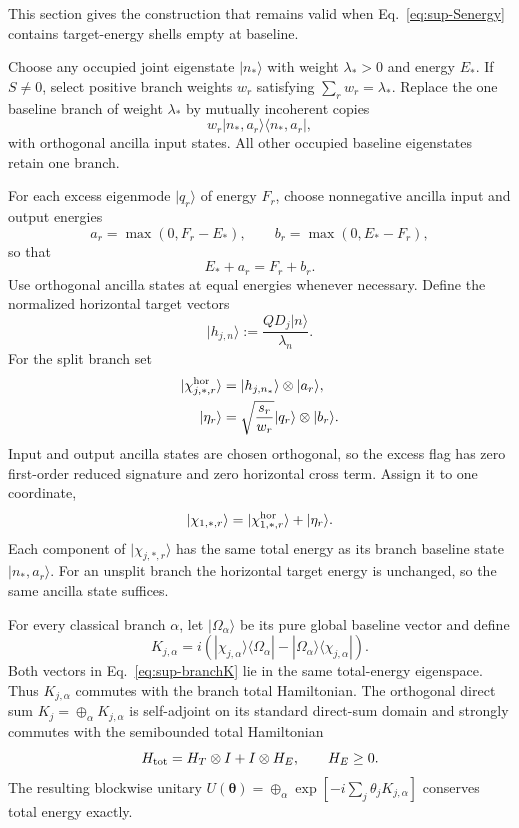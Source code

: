 \documentclass[aps,pra,preprint,nofootinbib]{revtex4-2}
\begin{document}
This section gives the construction that remains valid when Eq.~\eqref{eq:sup-Senergy} contains target-energy shells empty at baseline.

Choose any occupied joint eigenstate $|n_*\rangle$ with weight $\lambda_*>0$ and energy $E_*$. If $S\ne0$, select positive branch weights $w_r$ satisfying $\sum_rw_r=\lambda_*$. Replace the one baseline branch of weight $\lambda_*$ by mutually incoherent copies
\begin{equation}
 w_r|n_*,a_r\rangle\langle n_*,a_r|,
\end{equation}
with orthogonal ancilla input states. All other occupied baseline eigenstates retain one branch.

For each excess eigenmode $|q_r\rangle$ of energy $F_r$, choose nonnegative ancilla input and output energies
\begin{equation}
 a_r=\max(0,F_r-E_*),
 \qquad
 b_r=\max(0,E_*-F_r),
 \label{eq:sup-compensation}
\end{equation}
so that
\begin{equation}
 E_*+a_r=F_r+b_r.
\end{equation}
Use orthogonal ancilla states at equal energies whenever necessary. Define the normalized horizontal target vectors
\begin{equation}
 |h_{j,n}\rangle:=\frac{QD_j|n\rangle}{\lambda_n}.
\end{equation}
For the split branch set
\begin{align}
 |\chi^{\rm hor}_{j,*,r}\rangle&=|h_{j,n_*}\rangle\otimes|a_r\rangle,\\
 |\eta_r\rangle&=\sqrt{\frac{s_r}{w_r}}|q_r\rangle\otimes|b_r\rangle.
\end{align}
Input and output ancilla states are chosen orthogonal, so the excess flag has zero first-order reduced signature and zero horizontal cross term. Assign it to one coordinate,
\begin{equation}
 |\chi_{1,*,r}\rangle=|\chi^{\rm hor}_{1,*,r}\rangle+|\eta_r\rangle.
\end{equation}
Each component of $|\chi_{j,*,r}\rangle$ has the same total energy as its branch baseline state $|n_*,a_r\rangle$. For an unsplit branch the horizontal target energy is unchanged, so the same ancilla state suffices.

For every classical branch $\alpha$, let $|\Omega_\alpha\rangle$ be its pure global baseline vector and define
\begin{equation}
 K_{j,\alpha}
 =i(|\chi_{j,\alpha}\rangle\langle\Omega_\alpha|-|\Omega_\alpha\rangle\langle\chi_{j,\alpha}|).
 \label{eq:sup-branchK}
\end{equation}
Both vectors in Eq.~\eqref{eq:sup-branchK} lie in the same total-energy eigenspace. Thus $K_{j,\alpha}$ commutes with the branch total Hamiltonian. The orthogonal direct sum $K_j=\oplus_\alpha K_{j,\alpha}$ is self-adjoint on its standard direct-sum domain and strongly commutes with the semibounded total Hamiltonian
\begin{equation}
 H_{\rm tot}=H_T\otimes I+I\otimes H_E,
 \qquad H_E\ge0.
\end{equation}
The resulting blockwise unitary $U(\bm\theta)=\oplus_\alpha\exp[-i\sum_j\theta_jK_{j,\alpha}]$ conserves total energy exactly.
\end{document}
